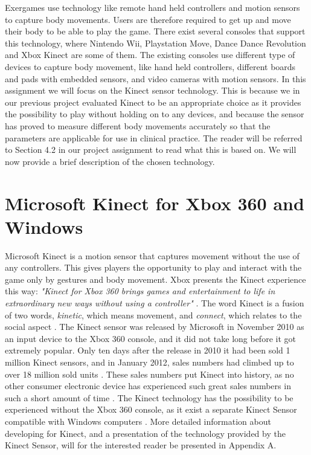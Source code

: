 Exergames use technology like remote hand held controllers and motion sensors to capture body movements. Users are therefore required to get up and move their body to be able to play the game. There exist several consoles that support this technology, where Nintendo Wii, Playstation Move, Dance Dance Revolution and Xbox Kinect are some of them. The existing consoles use different type of devices to capture body movement, like hand held controllers, different boards and pads with embedded sensors, and video cameras with motion sensors. In this assignment we will focus on the Kinect sensor technology. This is because we in our previous project evaluated Kinect to be an appropriate choice as it provides the possibility to play without holding on to any devices, and because the sensor has proved to measure different body movements accurately so that the parameters are applicable for use in clinical practice. The reader will be referred to Section 4.2 in our project assignment \cite{project} to read what this is based on. We will now provide a brief description of the chosen technology.

\section{Microsoft Kinect for Xbox 360 and Windows}
\label{sec:xbox}
Microsoft Kinect is a motion sensor that captures movement without the use of any controllers. This gives players the opportunity to play and interact with the game only by gestures and body movement. Xbox presents the Kinect experience this way: \emph{"Kinect for Xbox 360 brings games and entertainment to life in extraordinary new ways without using a controller"} \cite{kinectxboxdef}. The word Kinect is a fusion of two words, \emph{kinetic}, which means movement, and \emph{connect}, which relates to the social aspect \cite{howstuffworksKinect}. The Kinect sensor was released by Microsoft in November 2010 as an input device to the Xbox 360 console, and it did not take long before it got extremely popular. Only ten days after the release in 2010 it had been sold 1 million Kinect sensors, and in January 2012, sales numbers had climbed up to over 18 million sold units \cite{kinectsales}. These sales numbers put Kinect into history, as no other consumer electronic device has experienced such great sales numbers in such a short amount of time  \cite{kinectsales} \cite{microsoftnews}. The Kinect technology has the possibility to be experienced without the Xbox 360 console, as it exist a separate Kinect Sensor compatible with Windows computers \cite{kinectforwindows}. More detailed information about developing for Kinect, and a presentation of the technology provided by the Kinect Sensor, will for the interested reader be presented in Appendix A.

